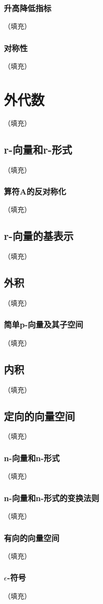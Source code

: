 \documentclass[hyperref,UTF8]{ctexbook}
\begin{document}
\subsection{升高降低指标}（填充）
\subsection{对称性}（填充）
\chapter{外代数}（填充）
\section{r-向量和r-形式}（填充）
\subsection{算符A的反对称化}（填充）
\section{r-向量的基表示}（填充）
\section{外积}（填充）
\subsection{简单p-向量及其子空间}（填充）
\section{内积}（填充）
\section{定向的向量空间}（填充）
\subsection{n-向量和n-形式}（填充）
\subsection{n-向量和n-形式的变换法则}（填充）
\subsection{有向的向量空间}（填充）
\subsection{$\epsilon$-符号}（填充）
\end{document}

